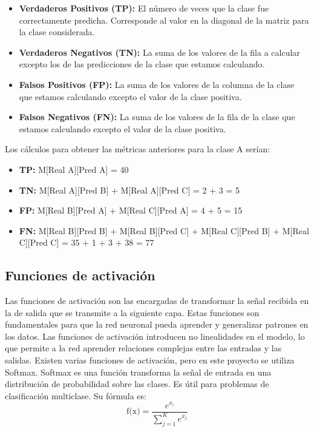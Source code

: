 \begin{itemize}
	\item \textbf{Verdaderos Positivos (TP):} El número de veces que la clase fue correctamente predicha. Corresponde al valor en la diagonal de la matriz para la clase considerada.
	\item \textbf{Verdaderos Negativos (TN):} La suma de los valores de la fila a calcular excepto los de las predicciones de la clase que estamos calculando.
	\item \textbf{Falsos Positivos (FP):} La suma de los valores de la columna de la clase que estamos calculando excepto el valor de la clase positiva.
	\item \textbf{Falsos Negativos (FN):} La suma de los valores de la fila de la clase que estamos calculando excepto el valor de la clase positiva.
\end{itemize}


Los cálculos para obtener las métricas anteriores para la clase A serían:

\begin{itemize}
	\item \textbf{TP:} M[Real A][Pred A] = 40
	\item \textbf{TN:} M[Real A][Pred B] + M[Real A][Pred C] = 2 + 3 = 5
	\item \textbf{FP:} M[Real B][Pred A] + M[Real C][Pred A] = 4 + 5 = 15
	\item \textbf{FN:} M[Real B][Pred B] + M[Real B][Pred C] + M[Real C][Pred B] + M[Real C][Pred C] = 35 + 1 + 3 + 38 = 77
\end{itemize}

\subsection{Funciones de activación}

Las funciones de activación son las encargadas de transformar la señal recibida en la de salida que se transmite a la siguiente capa.
Estas funciones son fundamentales para que la red neuronal pueda aprender y generalizar patrones en los datos.
Las funciones de activación introducen no linealidades en el modelo, lo que permite a la red aprender relaciones complejas entre las entradas y las salidas.
Existen varias funciones de activación\cite{funciones-activacion}, pero en este proyecto se utiliza Softmax.
Softmax es una función transforma la señal de entrada en una distribución de probabilidad sobre las clases. Es útil para problemas de clasificación multiclase. Su fórmula es: 
\begin{equation}
	\text{f(x)} = \frac{e^{x_i}}{\sum_{j=1}^{K} e^{x_j}}
\end{equation}

